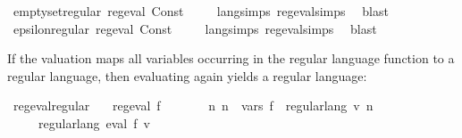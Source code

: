\begin{isabellebody}
\isanewline
\isanewline
{}\isamarkupfalse%
\ emptyset{\isacharunderscore}{\kern0pt}regular{\isacharcolon}{\kern0pt}\ {\isachardoublequoteopen}reg{\isacharunderscore}{\kern0pt}eval\ {\isacharparenleft}{\kern0pt}Const\ {\isacharbraceleft}{\kern0pt}{\isacharbraceright}{\kern0pt}{\isacharparenright}{\kern0pt}{\isachardoublequoteclose}\isanewline
%
\isadelimproof
\ \ %
\endisadelimproof
%
\isatagproof
{}\isamarkupfalse%
\ lang{\isachardot}{\kern0pt}simps{\isacharparenleft}{\kern0pt}{}{\isacharparenright}{\kern0pt}\ reg{\isacharunderscore}{\kern0pt}eval{\isachardot}{\kern0pt}simps{\isacharparenleft}{\kern0pt}{}{\isacharparenright}{\kern0pt}\ \isamarkupfalse%
\ blast%
\endisatagproof
{\isafoldproof}%
%
\isadelimproof
\isanewline
%
\endisadelimproof
\isanewline
{}\isamarkupfalse%
\ epsilon{\isacharunderscore}{\kern0pt}regular{\isacharcolon}{\kern0pt}\ {\isachardoublequoteopen}reg{\isacharunderscore}{\kern0pt}eval\ {\isacharparenleft}{\kern0pt}Const\ {\isacharbraceleft}{\kern0pt}{\isacharbrackleft}{\kern0pt}{\isacharbrackright}{\kern0pt}{\isacharbraceright}{\kern0pt}{\isacharparenright}{\kern0pt}{\isachardoublequoteclose}\isanewline
%
\isadelimproof
\ \ %
\endisadelimproof
%
\isatagproof
{}\isamarkupfalse%
\ lang{\isachardot}{\kern0pt}simps{\isacharparenleft}{\kern0pt}{}{\isacharparenright}{\kern0pt}\ reg{\isacharunderscore}{\kern0pt}eval{\isachardot}{\kern0pt}simps{\isacharparenleft}{\kern0pt}{}{\isacharparenright}{\kern0pt}\ \isamarkupfalse%
\ blast%
\endisatagproof
{\isafoldproof}%
%
\isadelimproof
%
\endisadelimproof
%
\begin{isamarkuptext}%
If the valuation  maps all variables occurring in the regular language function  to
a regular language, then evaluating  again yields a regular language:%
\end{isamarkuptext}\isamarkuptrue%
\isamarkupfalse%
\ reg{\isacharunderscore}{\kern0pt}eval{\isacharunderscore}{\kern0pt}regular{\isacharcolon}{\kern0pt}\isanewline
\ \ \ {\isachardoublequoteopen}reg{\isacharunderscore}{\kern0pt}eval\ f{\isachardoublequoteclose}\isanewline
\ \ \ \ \ \ \ {\isachardoublequoteopen}{\isasymAnd}n{\isachardot}{\kern0pt}\ n\ {\isasymin}\ vars\ f\ {\isasymLongrightarrow}\ regular{\isacharunderscore}{\kern0pt}lang\ {\isacharparenleft}{\kern0pt}v\ n{\isacharparenright}{\kern0pt}{\isachardoublequoteclose}\isanewline
\ \ \ \ \ {\isachardoublequoteopen}regular{\isacharunderscore}{\kern0pt}lang\ {\isacharparenleft}{\kern0pt}eval\ f\ v{\isacharparenright}{\kern0pt}{\isachardoublequoteclose}\isanewline

\end{isabellebody}
